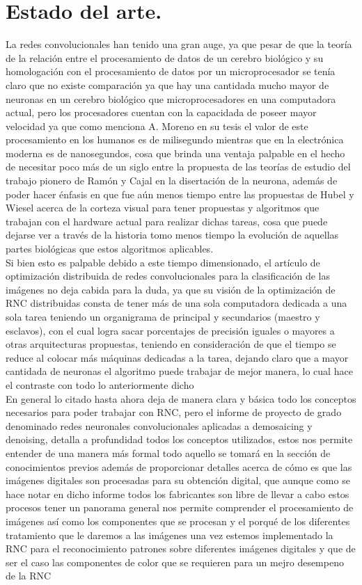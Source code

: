 \documentclass[a4paper, 12pt]{article}
\begin{document}
    \section{Estado del arte.}
    La redes convolucionales han tenido una gran auge, ya que pesar de que la teoría de la relación entre el procesamiento de datos de un cerebro biológico y su homologación con el procesamiento de datos por un microprocesador se tenía claro que no existe comparación ya que hay una cantidada mucho mayor de neuronas en un cerebro biológico que microprocesadores en una computadora actual, pero los procesadores cuentan con la capacidada de poseer mayor velocidad ya que como menciona A. Moreno en su tesis el valor de este procesamiento en los humanos es de milisegundo mientras que en la electrónica moderna es de nanosegundos, cosa que brinda una ventaja palpable en el hecho de necesitar poco más de un siglo entre la propuesta de las teorías de estudio del trabajo pionero de Ramón y Cajal en la disertación de la neurona, además de poder hacer énfasis en que fue aún menos tiempo entre las propuestas de Hubel y Wiesel acerca de la corteza visual para tener propuestas y algoritmos que trabajan con el hardware actual para realizar dichas tareas, cosa que puede dejarse ver a través de la historia tomo menos tiempo la evolución de aquellas partes biológicas que estos algoritmos aplicables\cite{artola2019clasificacion}.\\
    Si bien esto es palpable debido a este tiempo dimensionado, el artículo de optimización distribuida de redes convolucionales para la clasificación de las imágenes no deja cabida para la duda, ya que su visión de la optimización de RNC distribuidas consta de tener más de una sola computadora dedicada a una sola tarea teniendo un organigrama de principal y secundarios (maestro y esclavos), con el cual logra sacar porcentajes de precisión iguales o mayores a otras arquitecturas propuestas, teniendo en consideración de que el tiempo se reduce al colocar más máquinas dedicadas a la tarea, dejando claro que a mayor cantidada de neuronas el algoritmo puede trabajar de mejor manera, lo cual hace el contraste con todo lo anteriormente dicho\cite{hernandez2019optimizacion}\\
    En general lo citado hasta ahora deja de manera clara y básica todo los conceptos necesarios para poder trabajar con RNC, pero el informe de proyecto de grado denominado redes neuronales convolucionales aplicadas a demosaicing y denoising, detalla a profundidad todos los conceptos utilizados, estos nos permite entender de una manera más formal todo aquello se tomará en la sección de conocimientos previos además de proporcionar detalles acerca de cómo es que las imágenes digitales son procesadas para su obtención digital, que aunque como se hace notar en dicho informe todos los fabricantes son libre de llevar a cabo estos  procesos tener un panorama general nos permite comprender el procesamiento de imágenes así como los componentes que se procesan y el porqué de los diferentes tratamiento que le daremos a las imágenes una vez estemos implementado la RNC para el reconocimiento patrones sobre diferentes imágenes digitales y que de ser el caso las componentes de color que se requieren para un mejro desempeno de la RNC\cite{balduvin2019redes}
\end{document}
